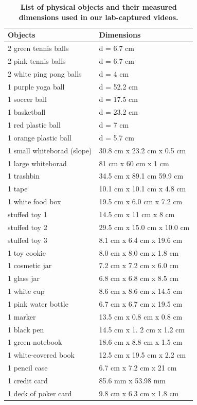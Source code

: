 \begin{table}[ht]
\centering
\small
\setlength{\tabcolsep}{8pt}
\renewcommand{\arraystretch}{1.1}
\begin{tabular}{l l}
\toprule
Objects & Dimensions \\
\midrule
2 green tennis balls & d = 6.7 cm \\
2 pink tennis balls & d = 6.7 cm \\
2 white ping pong balls & d = 4 cm \\
1 purple yoga ball & d = 52.2 cm \\
1 soccer ball & d = 17.5 cm \\
1 basketball & d = 23.2 cm \\
1 red plastic ball & d = 7 cm \\
1 orange plastic ball & d = 5.7 cm \\
1 small whiteborad (slope) & 30.8 cm x 23.2 cm x 0.5 cm \\
1 large whiteborad & 81 cm x 60 cm x 1 cm \\
1 trashbin & 34.5 cm x 89.1 cm 59.9 cm \\
1 tape & 10.1 cm x 10.1 cm x 4.8 cm \\
1 white food box & 19.5 cm x 6.0 cm x 7.2 cm \\
stuffed toy 1 & 14.5 cm x 11 cm x 8 cm \\
stuffed toy 2 & 29.5 cm x 15.0 cm x 10.0 cm \\
stuffed toy 3 & 8.1 cm x 6.4 cm x 19.6 cm \\
1 toy cookie & 8.0 cm x 8.0 cm x 1.8 cm \\
1 cosmetic jar & 7.2 cm x 7.2 cm x 6.0 cm \\
1 glass jar & 6.8 cm x 6.8 cm x 8.5 cm \\
1 white cup & 8.6 cm x 8.6 cm x 14.5 cm \\
1 pink water bottle & 6.7 cm x 6.7 cm x 19.5 cm \\
1 marker & 13.5 cm x 0.8 cm x 0.8 cm \\
1 black pen & 14.5 cm x 1. 2 cm x 1.2 cm \\
1 green notebook & 18.6 cm x 8.8 cm x 1.5 cm \\
1 white-covered book & 12.5 cm x 19.5 cm x 2.2 cm \\
1 pencil case & 6.7 cm x 7.2 cm x 21 cm \\
1 credit card & 85.6 mm x 53.98 mm \\
1 deck of poker card & 9.8 cm x 6.3 cm x 1.8 cm \\
\bottomrule
\end{tabular}
\caption{\textbf{List of physical objects and their measured dimensions used in our lab-captured videos.}}
\label{tab:object-list}
\end{table}

